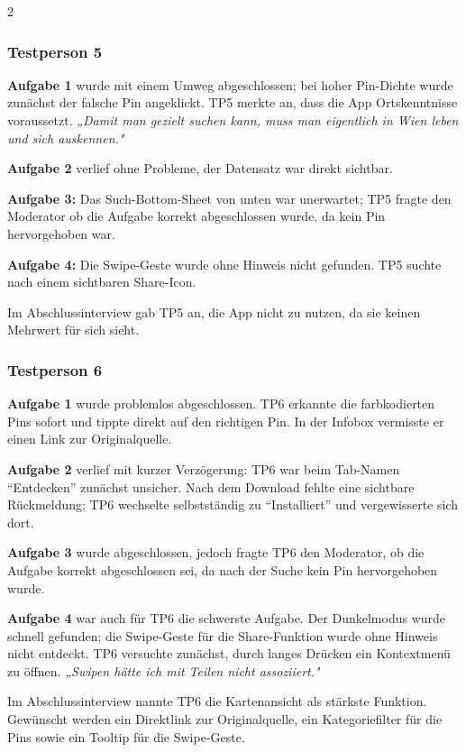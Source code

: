 \begin{multicols}{2}
\subsubsection*{Testperson 5}

\textbf{Aufgabe 1} wurde mit einem Umweg abgeschlossen; bei hoher
Pin-Dichte wurde zunächst der falsche Pin angeklickt.
TP5 merkte an, dass die App Ortskenntnisse voraussetzt.
\textit{„Damit man gezielt suchen kann, muss man eigentlich in Wien
leben und sich auskennen."}

\textbf{Aufgabe 2} verlief ohne Probleme, der Datensatz war direkt sichtbar.

\textbf{Aufgabe 3:} Das Such-Bottom-Sheet von unten war unerwartet;
TP5 fragte den Moderator ob die Aufgabe korrekt abgeschlossen wurde,
da kein Pin hervorgehoben war.

\textbf{Aufgabe 4:} Die Swipe-Geste wurde ohne Hinweis nicht gefunden.
TP5 suchte nach einem sichtbaren Share-Icon.

Im Abschlussinterview gab TP5 an, die App nicht zu nutzen, da sie
keinen Mehrwert für sich sieht.

\subsubsection*{Testperson 6}

\textbf{Aufgabe 1} wurde problemlos abgeschlossen. TP6 erkannte die
farbkodierten Pins sofort und tippte direkt auf den richtigen Pin.
In der Infobox vermisste er einen Link zur Originalquelle.

\textbf{Aufgabe 2} verlief mit kurzer Verzögerung: TP6 war beim
Tab-Namen \enquote{Entdecken} zunächst unsicher. Nach dem Download
fehlte eine sichtbare Rückmeldung; TP6 wechselte selbstständig zu
\enquote{Installiert} und vergewisserte sich dort.

\textbf{Aufgabe 3} wurde abgeschlossen, jedoch fragte TP6 den
Moderator, ob die Aufgabe korrekt abgeschlossen sei, da nach der
Suche kein Pin hervorgehoben wurde.

\textbf{Aufgabe 4} war auch für TP6 die schwerste Aufgabe. Der
Dunkelmodus wurde schnell gefunden; die Swipe-Geste für die
Share-Funktion wurde ohne Hinweis nicht entdeckt. TP6 versuchte
zunächst, durch langes Drücken ein Kontextmenü zu öffnen.
\textit{„Swipen hätte ich mit Teilen nicht assoziiert."}

Im Abschlussinterview nannte TP6 die Kartenansicht als stärkste
Funktion. Gewünscht werden ein Direktlink zur Originalquelle,
ein Kategoriefilter für die Pins sowie ein Tooltip für die
Swipe-Geste.


\end{multicols}
